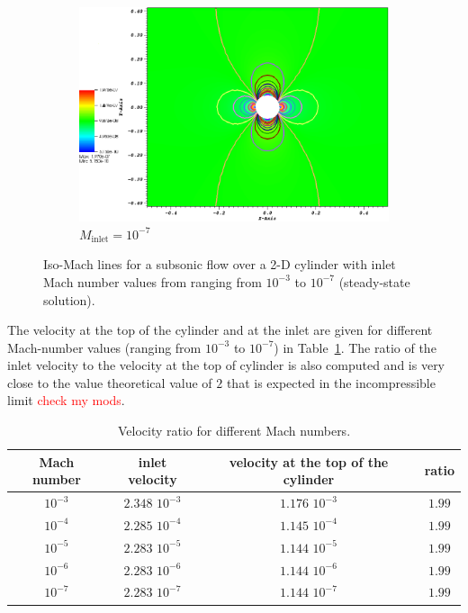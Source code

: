 \documentclass[preprint,10pt]{elsarticle}
\newcommand{\tbl}[1]{Table~\ref{#1}}                     %
\newcommand{\tcr}[1]{\textcolor{red}{#1}}
\begin{document}
\begin{figure}[H]
        \begin{subfigure}[b]{0.495\textwidth}
                \centering
                \includegraphics[width=\textwidth]{CylinderMach1em7ZoomIn.png}
                \caption{$M_{\text{inlet}}=10^{-7}$}
                \label{fig:cyl_1em7}
        \end{subfigure}
        \caption{Iso-Mach lines for a subsonic flow over a 2-D cylinder with inlet Mach number values from ranging from $10^{-3}$ to $10^{-7}$ (steady-state solution).}
				\label{fig:cylinder}
\end{figure}
%
The velocity at the top of the cylinder and at the inlet are given for different Mach-number values (ranging from $10^{-3}$ to $10^{-7}$) in \tbl{tbl:velocity_ratio}. The ratio of the inlet velocity to the velocity at the top of cylinder is also computed and is very close to the value theoretical value of $2$ that is expected in the incompressible limit \tcr{check my mods}.
%
\begin{table}[H]
\begin{center}
 \caption{\label{tbl:velocity_ratio}Velocity ratio for different Mach numbers.}
\begin{tabular}{|c|c|c|c|}
\hline
Mach number & inlet velocity & velocity at the top of the cylinder & ratio \\ \hline
$10^{-3}$ & $2.348$ $10^{-3}$ & $1.176$ $10^{-3}$& $1.99$  \\ \hline
$10^{-4}$ & $2.285$ $10^{-4}$ & $1.145$ $10^{-4}$& $1.99$  \\ \hline
$10^{-5}$ & $2.283$ $10^{-5}$ & $1.144$ $10^{-5}$ & $1.99$ \\ \hline
$10^{-6}$ & $2.283$ $10^{-6}$ & $1.144$ $10^{-6}$ & $1.99$ \\ \hline
$10^{-7}$ & $2.283$ $10^{-7}$ & $1.144$ $10^{-7}$ & $1.99$ \\ \hline
\end{tabular}
\end{center}
\nonumber
\end{table}
\end{document}
